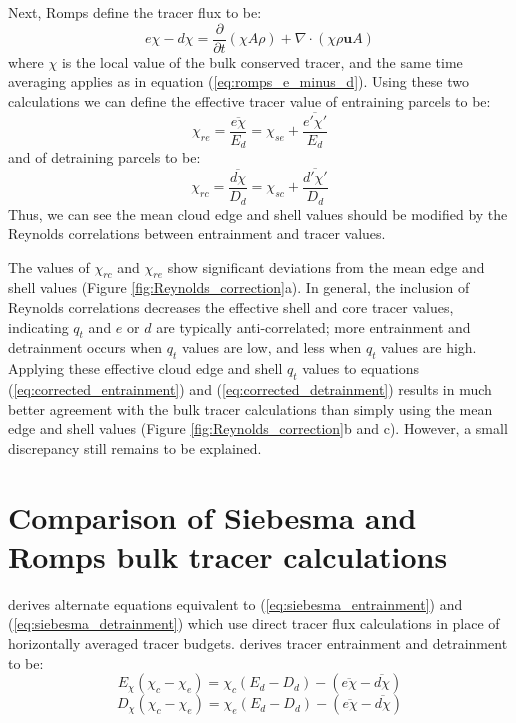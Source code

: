 \documentclass[draft,grl]{agutex}
\begin{document}
\begin{article}
Next, Romps define the tracer flux to be:
\begin{equation}
  \label{eq:romps_echi_minus_dchi}
  e\chi - d\chi = \frac{\partial}{\partial t}(\chi A \rho) 
                + \nabla \cdot (\chi \rho \mathbf{u} A) 
\end{equation}
where $\chi$ is the local value of the bulk conserved tracer, and the same time 
averaging applies as in equation (\ref{eq:romps_e_minus_d}).  Using these two 
calculations we can define the effective tracer value of entraining parcels to 
be:
\begin{equation}
  \label{eq:chi_re}
  \chi_{re} = \frac{\overline{e\chi} }{E_d} 
            = \chi_{se} + \frac{\overline{e' \chi'}}{E_d}
\end{equation}
and of detraining parcels to be:
\begin{equation}
  \label{eq:chi_rc}
  \chi_{rc} = \frac{\overline{d\chi}}{D_d} 
            = \chi_{sc} + \frac{\overline{d' \chi'}}{D_d}
\end{equation}
Thus, we can see the mean cloud edge and shell values should be modified by 
the Reynolds correlations between entrainment and tracer values.

The values of $\chi_{rc}$ and $\chi_{re}$ show significant deviations from 
the mean edge and shell values (Figure \ref{fig:Reynolds_correction}a).
In general, the inclusion of Reynolds correlations decreases the effective 
shell and core tracer values, indicating $q_t$ and $e$ or $d$ are typically 
anti-correlated; more entrainment and detrainment occurs when $q_t$ values are 
low, and less when $q_t$ values are high.  Applying these effective cloud edge 
and shell $q_t$ values to equations (\ref{eq:corrected_entrainment}) and 
(\ref{eq:corrected_detrainment}) results in much better agreement with the bulk 
tracer calculations than simply using the mean edge and shell values 
(Figure \ref{fig:Reynolds_correction}b and c).  However, a small discrepancy 
still remains to be explained.


\section{Comparison of Siebesma and Romps bulk tracer calculations}

\cite{Romps2010} derives alternate equations equivalent to 
(\ref{eq:siebesma_entrainment}) and (\ref{eq:siebesma_detrainment}) which use
direct tracer flux calculations in place of horizontally averaged tracer 
budgets.  \cite{Romps2010} derives tracer entrainment and detrainment to be:
\begin{equation}
  \label{eq:romps_entrainment}
  E_{\chi}(\chi_{c} - \chi_{e}) = \chi_{c}(E_d-D_d) 
                                - (\overline{e\chi} - \overline{d\chi})
\end{equation}
\begin{equation}
  \label{eq:romps_detrainment}
  D_{\chi}(\chi_{c} - \chi_{e}) = \chi_{e}(E_d-D_d) 
                                - (\overline{e\chi} - \overline{d\chi})
\end{equation}


\end{article}
\end{document}
